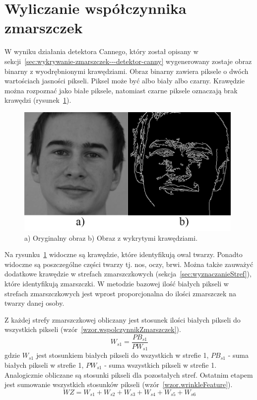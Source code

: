 \documentclass[a4paper,twoside,12pt]{book}
\begin{document}
    \section{Wyliczanie współczynnika zmarszczek}\label{sec:wyliczanieWrinkleFeature}
    W wyniku działania detektora Cannego, który został opisany w sekcji~\ref{sec:wykrywanie-zmarszczek---detektor-canny}
    wygenerowany zostaje obraz binarny z wyodrębnionymi krawędziami.
    Obraz binarny zawiera piksele o dwóch wartościach jasności pikseli.
    Piksel może być albo biały albo czarny.
    Krawędzie można rozpoznać jako białe piksele, natomiast czarne piksele oznaczają brak krawędzi (rysunek~\ref{fig.mojaTwarzGray}).

    \begin{figure}[h!]
        \centering
        \includegraphics[width=11cm]{Obrazy/mojaTwarzGray.jpg}
        \caption{a) Oryginalny obraz b) Obraz z wykrytymi krawędziami.} %
        \label{fig.mojaTwarzGray}
    \end{figure}

    Na rysunku~\ref{fig.mojaTwarzGray} widoczne są krawędzie, które identyfikują owal twarzy.
    Ponadto widoczne są poszczególne części twarzy tj. nos, oczy, brwi.
    Można także zauważyć dodatkowe krawędzie w strefach zmarszczkowych (sekcja~\ref{sec:wyznaczanieStref}),
    które identyfikują zmarszczki.
    W metodzie bazowej ilość białych pikseli w strefach zmarszczkowych jest wprost proporcjonalna do ilości zmarszczek
    na twarzy danej osoby.

    Z każdej strefy zmarszczkowej obliczany jest stosunek ilości białych pikseli do wszystkich
    pikseli (wzór~\ref{wzor.wspolczynnikZmarszczek}).
    \large
    \begin{equation}
        W_{s1} = \frac{PB_{s1}}{PW_{s1}}
        \label{wzor.wspolczynnikZmarszczek}
    \end{equation}
    \normalsize
    gdzie $W_{s1}$ jest stosunkiem białych pikseli do wszystkich w strefie 1,
    $PB_{s1}$ - suma białych pikseli w strefie 1, $PW_{s1}$ - suma wszystkich pikseli w strefie 1.
    Analogicznie obliczane są stosunki pikseli dla pozostałych stref.
    Ostatnim etapem jest sumowanie wszystkich stosunków pikseli (wzór~\ref{wzor.wrinkleFeature}).
    \large
    \begin{equation}
        WZ = W_{s1} + W_{s2} + W_{s3} + W_{s4} + W_{s5} + W_{s6}
        \label{wzor.wrinkleFeature}
    \end{equation}
    \normalsize
\end{document}
